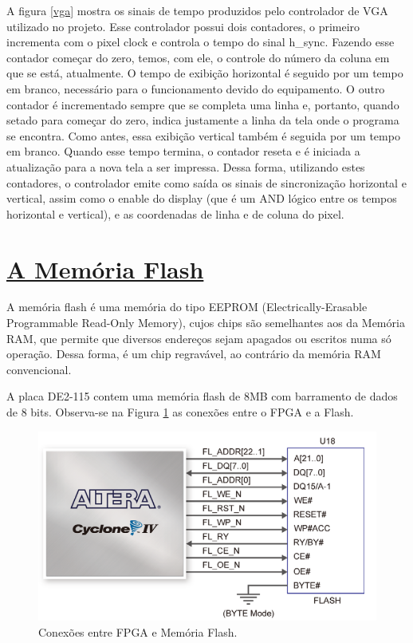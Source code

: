 \documentclass[14pt, oneside]{book}
\newcommand\tab[1][1cm]{\hspace*{#1}}
\theoremstyle{definition}
\begin{document}
             \tab A figura \ref{vga} mostra os sinais de tempo produzidos pelo controlador de VGA utilizado
no projeto. Esse controlador possui dois contadores, o primeiro incrementa com o pixel
clock e controla o tempo do sinal h\_sync. Fazendo esse contador começar do zero, temos,
com ele, o controle do número da coluna em que se está, atualmente. O tempo de exibição
horizontal é seguido por um tempo em branco, necessário para o funcionamento devido
do equipamento.
O outro contador é incrementado sempre que se completa uma linha e, portanto,
quando setado para começar do zero, indica justamente a linha da tela onde o programa
se encontra. Como antes, essa exibição vertical também é seguida por um tempo em
branco. Quando esse tempo termina, o contador reseta e é iniciada a atualização para a
nova tela a ser impressa.
Dessa forma, utilizando estes contadores, o controlador emite como saída os sinais de
sincronização horizontal e vertical, assim como o enable do display (que é um AND lógico
entre os tempos horizontal e vertical), e as coordenadas de linha e de coluna do pixel.
             
             
             
             
            
            \section[A Memória Flash]{\hyperlink{toc}{A Memória Flash}}
            
               \tab  A memória flash é uma memória do tipo EEPROM (Electrically-Erasable Programmable Read-Only Memory), cujos chips são semelhantes aos da Memória RAM, que permite que diversos endereços sejam apagados ou escritos numa só operação. Dessa forma, é um chip regravável, ao contrário da memória RAM convencional.
               
               \tab A placa DE2-115 contem uma memória flash de 8MB com barramento de dados de 8 bits. Observa-se na Figura \ref{conexões flash} as conexões entre o FPGA e a Flash.
               
                \begin{figure}[H]
                    \centering
                    \includegraphics[scale=0.8]{flash.PNG}
                    \caption{Conexões entre FPGA e Memória Flash.}
                    \label{conexões flash}
                \end{figure}
                    
\end{document}
